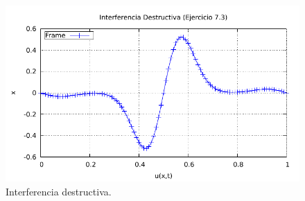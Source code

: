 \begin{figure}[H]
	\centering
	\includegraphics[scale=1]{../img/ej7-3d.pdf}
	\caption{Interferencia destructiva.}
	\label{ej7-3d}
\end{figure}













































